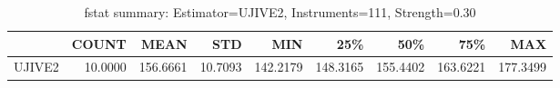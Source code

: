 \begin{table}[ht]
\centering
\caption{fstat summary: Estimator=UJIVE2, Instruments=111, Strength=0.30}
\begin{tabular}{lrrrrrrrr}
\toprule
 & COUNT & MEAN & STD & MIN & 25\% & 50\% & 75\% & MAX \\
\midrule
UJIVE2 & 10.0000 & 156.6661 & 10.7093 & 142.2179 & 148.3165 & 155.4402 & 163.6221 & 177.3499 \\
\bottomrule
\end{tabular}
\end{table}
